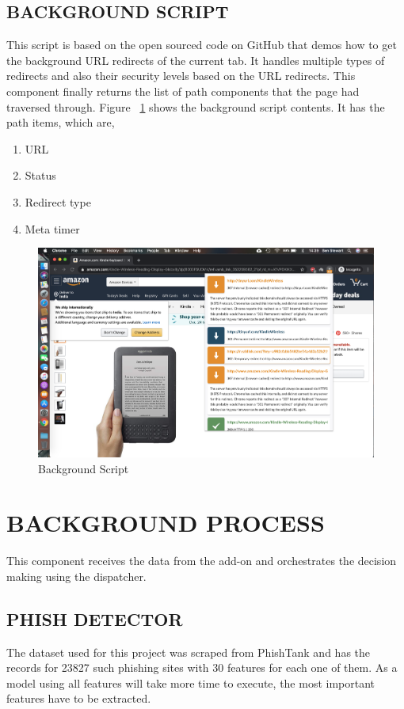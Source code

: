 \subsection{BACKGROUND SCRIPT}
This script is based on the open sourced code on GitHub\cite{ccampbell} that demos how to get the background URL redirects of the current tab. It handles multiple types of redirects and also their security levels based on the URL redirects. This component finally returns the list of path components that the page had traversed through. Figure ~\ref{fig:bgscript} shows the background script contents. It has the path items, which are,


\begin{enumerate}
    \item URL
    \item Status
    \item Redirect type
    \item Meta timer
 \end{enumerate}

\begin{figure}[htp]
\centering
\includegraphics[scale=0.15]{Figures/image5.png}
\caption{Background Script}
\label{fig:bgscript}
\end{figure}

\section{BACKGROUND PROCESS}
This component receives the data from the add-on and orchestrates the decision making using the dispatcher.

\subsection{PHISH DETECTOR}
The dataset used for this project was scraped from PhishTank\cite{pt} and has the records for 23827 such phishing sites with 30 features for each one of them. As a model using all features will take more time to execute, the most important features have to be extracted.

